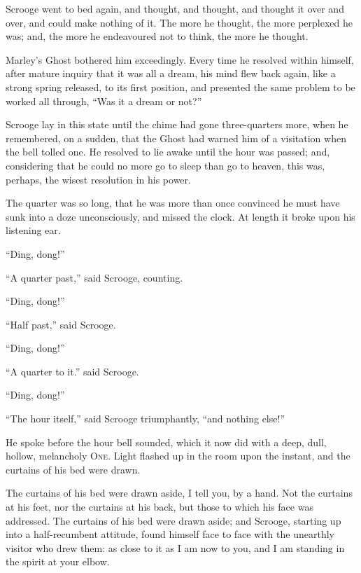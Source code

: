 \documentclass[paper=5.5in:8.5in,BCOR=7mm,twoside,DIV=calc,12pt,usegeometry]{scrbook} %
\begin{document}
Scrooge went to bed again, and thought, and thought, and \newline thought it over and over, and could make nothing of it. The more he thought, the more perplexed he was; and, the more he endeavoured not to think, the more he thought.

Marley's Ghost bothered him exceedingly. Every time he resolved within himself, after mature inquiry that it was all a dream, his mind flew back again, like a strong spring released, to its first position, and presented the same problem to be worked all through, \enquote{Was it a dream or not?}

Scrooge lay in this state until the chime had gone three-quarters more, when he remembered, on a sudden, that the Ghost had warned him of a visitation when the bell tolled one. He resolved to lie awake until the hour was passed; and, considering that he could no more go to sleep than go to heaven, this was, perhaps, the wisest resolution in his power.

The quarter was so long, that he was more than once convinced he must have sunk into a doze unconsciously, and missed the clock. At length it broke upon his listening ear.

\enquote{Ding, dong!}

\enquote{A quarter past,} said Scrooge, counting.

\enquote{Ding, dong!}

\enquote{Half past,} said Scrooge.

\enquote{Ding, dong!}

\enquote{A quarter to it.} said Scrooge.

\enquote{Ding, dong!}

\enquote{The hour itself,} said Scrooge triumphantly, \enquote{and nothing else!}

He spoke before the hour bell sounded, which it now did with a deep, dull, hollow, melancholy \textsc{One}. Light flashed up in the room upon the instant, and the curtains of his bed were drawn.

The curtains of his bed were drawn aside, I tell you, by a hand. Not the curtains at his feet, nor the curtains at his back, but those to which his face was addressed. The curtains of his bed were drawn aside; and Scrooge, starting up into a half-recumbent attitude, found himself face to face with the unearthly visitor who drew them: as close to it as I am now to you, and I am standing in the spirit at your elbow.
\end{document}
